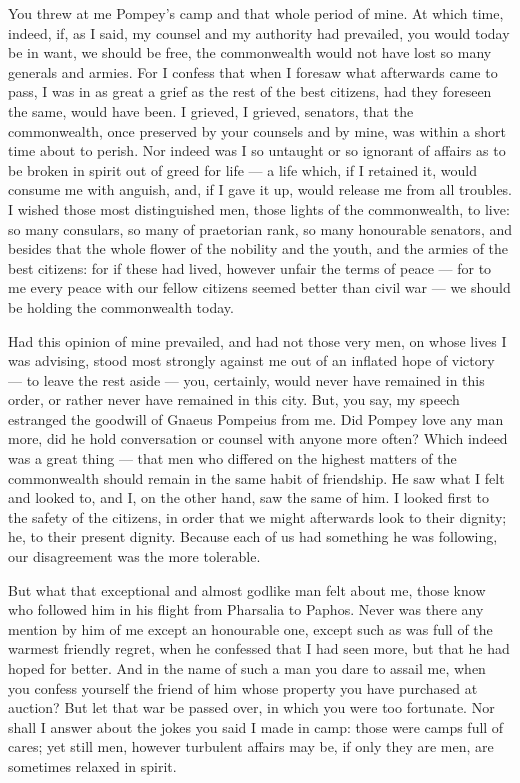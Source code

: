  You threw at me Pompey's camp and that whole period of mine. At which time, indeed, if, as I said, my counsel and my authority had prevailed, you would today be in want, we should be free, the commonwealth would not have lost so many generals and armies. For I confess that when I foresaw what afterwards came to pass, I was in as great a grief as the rest of the best citizens, had they foreseen the same, would have been. I grieved, I grieved, senators, that the commonwealth, once preserved by your counsels and by mine, was within a short time about to perish. Nor indeed was I so untaught or so ignorant of affairs as to be broken in spirit out of greed for life --- a life which, if I retained it, would consume me with anguish, and, if I gave it up, would release me from all troubles. I wished those most distinguished men, those lights of the commonwealth, to live: so many consulars, so many of praetorian rank, so many honourable senators, and besides that the whole flower of the nobility and the youth, and the armies of the best citizens: for if these had lived, however unfair the terms of peace --- for to me every peace with our fellow citizens seemed better than civil war --- we should be holding the commonwealth today.

 Had this opinion of mine prevailed, and had not those very men, on whose lives I was advising, stood most strongly against me out of an inflated hope of victory --- to leave the rest aside --- you, certainly, would never have remained in this order, or rather never have remained in this city. But, you say, my speech estranged the goodwill of Gnaeus Pompeius from me. Did Pompey love any man more, did he hold conversation or counsel with anyone more often? Which indeed was a great thing --- that men who differed on the highest matters of the commonwealth should remain in the same habit of friendship. He saw what I felt and looked to, and I, on the other hand, saw the same of him. I looked first to the safety of the citizens, in order that we might afterwards look to their dignity; he, to their present dignity. Because each of us had something he was following, our disagreement was the more tolerable.

 But what that exceptional and almost godlike man felt about me, those know who followed him in his flight from Pharsalia to Paphos. Never was there any mention by him of me except an honourable one, except such as was full of the warmest friendly regret, when he confessed that I had seen more, but that he had hoped for better. And in the name of such a man you dare to assail me, when you confess yourself the friend of him whose property you have purchased at auction? But let that war be passed over, in which you were too fortunate. Nor shall I answer about the jokes you said I made in camp: those were camps full of cares; yet still men, however turbulent affairs may be, if only they are men, are sometimes relaxed in spirit.


